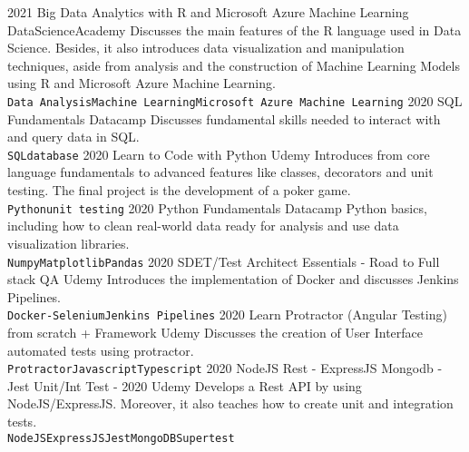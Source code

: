 \documentclass[9pt]{developercv} %
\begin{document}
\begin{entrylist}
	\entry
		{2021}%
		{Big Data Analytics with R and Microsoft Azure Machine Learning}
		{DataScienceAcademy}
		{Discusses the main features of the R language used in Data Science. Besides, it also introduces data visualization and manipulation techniques, aside from analysis and the construction of Machine Learning Models using R and Microsoft Azure Machine Learning.\\ 
		\texttt{Data Analysis}\slashsep\texttt{Machine Learning}\slashsep\texttt{Microsoft Azure Machine Learning}}
	\entry
		{2020}%
		{SQL Fundamentals}
		{Datacamp}
		{Discusses fundamental skills needed to interact with and query data in SQL.\\ 
		\texttt{SQL}\slashsep\texttt{database}}
	\entry
		{2020}
		{Learn to Code with Python}
		{Udemy}
		{Introduces from core language fundamentals to advanced features like classes, decorators and unit testing. The final project is the development of a poker game.\\ 
		\texttt{Python}\slashsep\texttt{unit testing}}
	\entry
		{2020}%
		{Python Fundamentals}
		{Datacamp}
		{Python basics, including how to clean real-world data ready for analysis and use data visualization libraries.\\ 
		\texttt{Numpy}\slashsep\texttt{Matplotlib}\slashsep\texttt{Pandas}}
	\entry
		{2020}
		{SDET/Test Architect Essentials - Road to Full stack QA}
		{Udemy}
		{Introduces the implementation of Docker and discusses Jenkins Pipelines.\\ 
		\texttt{Docker-Selenium}\slashsep\texttt{Jenkins Pipelines}}
	\entry
		{2020}
		{Learn Protractor (Angular Testing) from scratch + Framework}
		{Udemy}
		{Discusses the creation of User Interface automated tests using protractor.\\
		\texttt{Protractor}\slashsep\texttt{Javascript}\slashsep\texttt{Typescript}}
	\entry
		{2020}%
		{NodeJS Rest - ExpressJS Mongodb - Jest Unit/Int Test - 2020}
		{Udemy}
		{Develops a Rest API by using NodeJS/ExpressJS. Moreover, it also teaches how to create unit and integration tests.\\
		\texttt{NodeJS}\slashsep\texttt{ExpressJS}\slashsep\texttt{Jest}\slashsep\texttt{MongoDB}\slashsep\texttt{Supertest}}	
	\entry

\end{entrylist}
\end{document}

